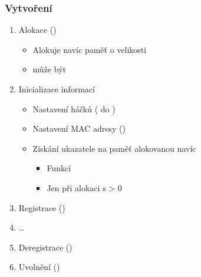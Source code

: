 \begin{frame}
  \frametitle{Vytvoření }

  \begin{enumerate}
    \item Alokace ()
    \begin{itemize}
      \item Alokuje navíc paměť o velikosti 
      \item {} může být 
    \end{itemize}

    \pause

    \item Inicializace informací
    \begin{itemize}
      \item Nastavení háčků ( do )

      \pause

      \item Nastavení MAC adresy ()

      \pause

      \item Získání ukazatele na paměť alokovanou navíc
      \begin{itemize}
	\item Funkcí 
	\item Jen při alokaci s  > 0
      \end{itemize}
    \end{itemize}

    \pause

    \item Registrace ()
    \item \dots

    \pause

    \item Deregistrace ()
    \item Uvolnění ()
  \end{enumerate}

\end{frame}

